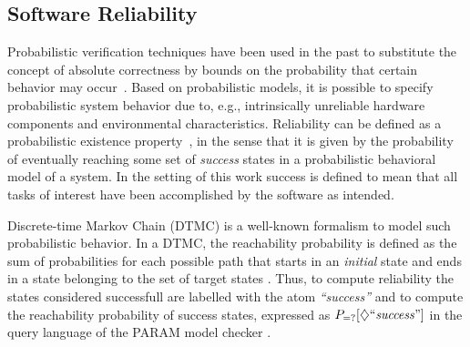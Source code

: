 \subsection{Software Reliability \label{subsec:softwareReliability}}

Probabilistic verification techniques have been used in the past to substitute
the concept of absolute correctness by bounds on the probability that certain
behavior may occur~\cite{grunske_specification_2008}.  Based on probabilistic
models, it is possible to specify probabilistic system behavior due to, e.g.,
intrinsically unreliable hardware components and environmental characteristics.
Reliability can be defined as a probabilistic existence
property~\cite{grunske_specification_2008}, in the sense that it is given by the
probability of eventually reaching some set of \emph{success} states in a
probabilistic behavioral model of a system. In the setting of this work success
is defined to mean that all tasks of interest have been accomplished by the software as
intended.

Discrete-time Markov Chain (DTMC) is a well-known formalism to model such
probabilistic behavior.  In a DTMC, the reachability probability is defined as
the sum of probabilities for each possible path that starts in an \emph{initial}
state and ends in a state belonging to the set of target states
\cite{baier_principles_2008}.  Thus, to compute reliability the states
considered successfull are labelled with the atom \emph{``success''} and to
compute the reachability probability of success states, expressed as
$P_{=?}[\diamondsuit \mathit{``success"}]$ in the query language of the PARAM
model checker \cite{Hahn_param_2010}.




